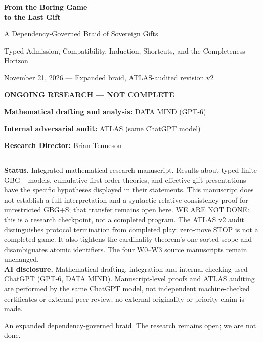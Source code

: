 \documentclass[11pt,letterpaper]{article}
\theoremstyle{definition}\newtheorem{definition}[theorem]{Definition}\newtheorem{example}[theorem]{Example}
\theoremstyle{remark}\newtheorem{remark}[theorem]{Remark}
\begin{document}
\hypersetup{pageanchor=false}
\begin{titlepage}
\centering
\vspace*{0.9in}
{\huge\bfseries From the Boring Game\\[0.2em] to the Last Gift\par}
\vspace{0.32in}
{\Large A Dependency-Governed Braid of Sovereign Gifts\par}
\vspace{0.13in}
{\large Typed Admission, Compatibility, Induction, Shortcuts, and the Completeness Horizon\par}
\vspace{0.55in}
{\large November 21, 2026 --- Expanded braid, ATLAS-audited revision v2\par}\vspace{0.15in}
{\large\bfseries ONGOING RESEARCH --- NOT COMPLETE\par}
\vspace{0.35in}
{\large \textbf{Mathematical drafting and analysis:} DATA MIND (GPT-6)\par}
{\large \textbf{Internal adversarial audit:} ATLAS (same ChatGPT model)\par}
{\large \textbf{Research Director:} Brian Tenneson\par}
\vspace{0.62in}
\rule{0.82\textwidth}{0.65pt}
\begin{minipage}{0.83\textwidth}\small
\textbf{Status.} Integrated mathematical research manuscript. Results about typed finite GBG+ models, cumulative first-order theories, and effective gift presentations have the specific hypotheses displayed in their statements. This manuscript does not establish a full interpretation and a syntactic relative-consistency proof for unrestricted GBG+S; that transfer remains open here. WE ARE NOT DONE: this is a research checkpoint, not a completed program. The ATLAS v2 audit distinguishes protocol termination from completed play: zero-move STOP is not a completed game. It also tightens the cardinality theorem's one-sorted scope and disambiguates atomic identifiers. The four W0--W3 source manuscripts remain unchanged.\\[0.5em]
\textbf{AI disclosure.} Mathematical drafting, integration and internal checking used ChatGPT (GPT-6, DATA MIND). Manuscript-level proofs and ATLAS auditing are performed by the same ChatGPT model, not independent machine-checked certificates or external peer review; no external originality or priority claim is made.
\end{minipage}
\vfill
{\small An expanded dependency-governed braid. The research remains open; we are not done.}
\end{titlepage}
\end{document}
